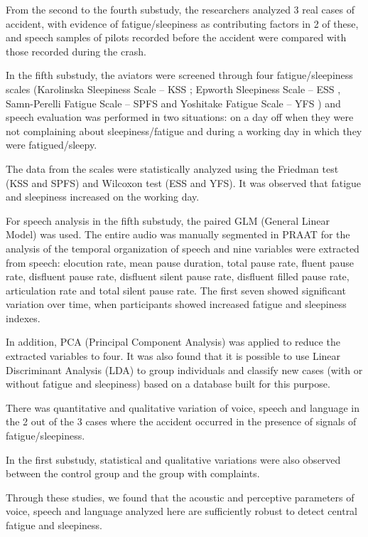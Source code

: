 From the second to the fourth substudy, the researchers analyzed 3 real cases
of accident, with evidence of fatigue/sleepiness as contributing factors in 2
of these, and speech samples of pilots recorded before the accident were
compared with those recorded during the crash. 

In the fifth substudy, the aviators were screened through four
fatigue/sleepiness scales (Karolinska Sleepiness Scale -- KSS
\citep{akerstedt1990}; Epworth Sleepiness Scale -- ESS \citep{johns1993},
Samn-Perelli Fatigue Scale -- SPFS \citep{samn1982} and Yoshitake Fatigue Scale --
YFS \citep{yoshitake1971}) and speech evaluation was performed in two
situations: on a day off when they were not complaining about
sleepiness/fatigue and during a working day in which they were fatigued/sleepy. 

The data from the scales were statistically analyzed using the Friedman test
(KSS and SPFS) and Wilcoxon test (ESS and YFS). It was observed that fatigue
and sleepiness increased on the working day.

For speech analysis in the fifth substudy, the paired GLM (General Linear
Model) was used. The entire audio was manually segmented in PRAAT for the
analysis of the temporal organization of speech \citep{grosjean1978,maclay1959} and nine variables were
extracted from speech: elocution rate, mean pause duration, total pause rate,
fluent pause rate, disfluent pause rate, disfluent silent pause rate, disfluent
filled pause rate, articulation rate and total silent pause rate. The first
seven showed significant variation over time, when participants showed
increased fatigue and sleepiness indexes.

In addition, PCA (Principal Component Analysis) was applied to reduce the
extracted variables to four. It was also found that it is possible to use
Linear Discriminant Analysis (LDA) to group individuals and classify new cases
(with or without fatigue and sleepiness) based on a database built for this
purpose.

There was quantitative and qualitative variation of voice, speech and language
in the 2 out of the 3 cases where the accident occurred in the presence of
signals of fatigue/sleepiness.

In the first substudy, statistical and qualitative variations were also
observed between the control group and the group with complaints.

Through these studies, we found that the acoustic and perceptive parameters of
voice, speech and language analyzed here are sufficiently robust to detect
central fatigue and sleepiness.




